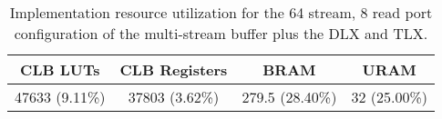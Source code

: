 \begin{table}[H]
  \centering
  \caption{Implementation resource utilization for the 64 stream, 8 read port configuration of the multi-stream buffer plus the DLX and TLX.}
  \label{tab:synth5}
  \begin{tabular}{ c | c | c | c }
    \textbf{CLB LUTs} & \textbf{CLB Registers} & \textbf{BRAM} & \textbf{URAM} \\ \hline \hline
    47633 (9.11\%) & 37803 (3.62\%) & 279.5 (28.40\%) & 32 (25.00\%) \\
  \end{tabular}
\end{table}




